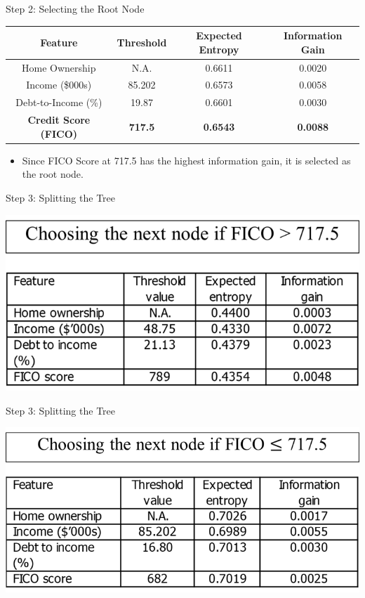 \documentclass[11pt]{beamer}
\begin{document}
%
%
\begin{frame}{Step 2: Selecting the Root Node}
\footnotesize{
    \begin{table}[]
        \centering
        \begin{tabular}{|c|c|c|c|}
            \hline
            Feature & Threshold & Expected Entropy & Information Gain \\
            \hline
            Home Ownership & N.A. & 0.6611 & 0.0020 \\
            Income (\$000s) & 85.202 & 0.6573 & 0.0058 \\
            Debt-to-Income (\%) & 19.87 & 0.6601 & 0.0030 \\
            \textbf{Credit Score (FICO)} & \textbf{717.5} & \textbf{0.6543} & \textbf{0.0088} \\
            \hline
        \end{tabular}
    \end{table}
    }
    \begin{itemize}
        \item Since FICO Score at 717.5 has the highest information gain, it is selected as the root node.
    \end{itemize}
\end{frame}
%
%
\begin{frame}{Step 3: Splitting the Tree}
	\begin{center}
	\includegraphics[scale=.5]{../05-pictures/lesson-3-3_pic_5.png}
	\end{center}
\end{frame}
%
%
\begin{frame}{Step 3: Splitting the Tree}
	\begin{center}
	\includegraphics[scale=.5]{../05-pictures/lesson-3-3_pic_6.png}
	\end{center}
\end{frame}
\end{document}

